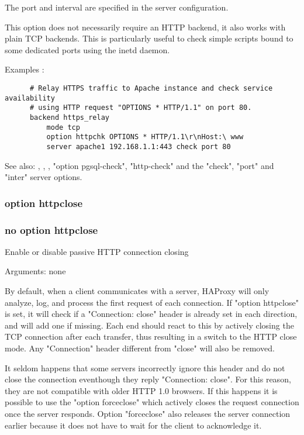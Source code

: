   The port and interval are specified in the server configuration.

  This option does not necessarily require an HTTP backend, it also works with
  plain TCP backends. This is particularly useful to check simple scripts bound
  to some dedicated ports using the inetd daemon.

  Examples :
\begin{verbatim}
      # Relay HTTPS traffic to Apache instance and check service availability
      # using HTTP request "OPTIONS * HTTP/1.1" on port 80.
      backend https_relay
          mode tcp
          option httpchk OPTIONS * HTTP/1.1\r\nHost:\ www
          server apache1 192.168.1.1:443 check port 80
\end{verbatim}

  See also: , , ,
             "option pgsql-check", "http-check" and the "check", "port" and
             "inter" server options.

\subsubsection[option httpclose]{option httpclose}
\subsubsection[no option httpclose]{no option httpclose}


  Enable or disable passive HTTP connection closing


  Arguments: none

  By default, when a client communicates with a server, HAProxy will only
  analyze, log, and process the first request of each connection. If "option
  httpclose" is set, it will check if a "Connection: close" header is already
  set in each direction, and will add one if missing. Each end should react to
  this by actively closing the TCP connection after each transfer, thus
  resulting in a switch to the HTTP close mode. Any "Connection" header
  different from "close" will also be removed.

  It seldom happens that some servers incorrectly ignore this header and do not
  close the connection eventhough they reply "Connection: close". For this
  reason, they are not compatible with older HTTP 1.0 browsers. If this happens
  it is possible to use the "option forceclose" which actively closes the
  request connection once the server responds. Option "forceclose" also
  releases the server connection earlier because it does not have to wait for
  the client to acknowledge it.

